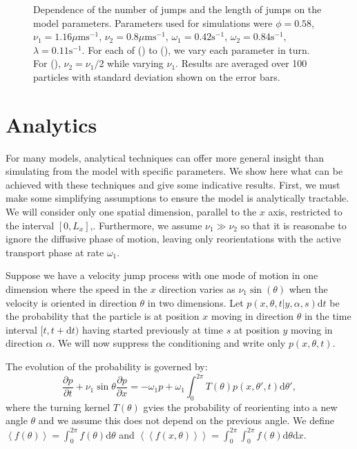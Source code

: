 \documentclass[twocolumn]{biophys}
\newlength\tindent
\renewcommand{\indent}{\hspace*{\tindent}}
\def\mean#1{\left< #1 \right>}
\begin{document}
\begin{figure*}
        \caption{ \small Dependence of the number of jumps and the length of jumps on the model parameters. Parameters used for simulations were $\phi=0.58$, $\nu_1=1.16 \mu \text{ms}^{-1}$, $\nu_2=0.8 \mu \text{ms}^{-1}$, $\omega_1=0.42 \text{s}^{-1}$, $\omega_2=0.84 \text{s}^{-1}$, $\lambda=0.11 \text{s}^{-1}$.
        For each of () to (), we vary each parameter in turn. 
        For (), $\nu_2=\nu_1 / 2$ while varying $\nu_1$. Results are averaged over 100 particles with standard deviation shown on the error bars.}
        \label{FIG:Sensitivity_analysis_2}
    \end{figure*}

    \section{Analytics} \label{Analytics}
For many models, analytical techniques can offer more general insight than simulating from the model with specific parameters.
We show here what can be achieved with these techniques and give some indicative results.
First, we must make some simplifying assumptions to ensure the model is analytically tractable. We will consider only one spatial dimension, parallel to the $x$ axis, restricted to the interval $[0,L_x]$,.
Furthermore, we assume $\nu_1 \gg \nu_2$ so that it is reasonabe to ignore the diffusive phase of motion, leaving only reorientations with the active transport phase at rate $\omega_1$.

\indent Suppose we have a velocity jump process with one mode of motion in one dimension where the speed in the $x$ direction varies as $\nu_1 \sin (\theta)$ when the velocity is oriented in direction $\theta$ in two dimensions.
Let $ p(x,\theta,t | y, \alpha, s)\text{d}t$ be the probability that the particle is at position $x$ moving in direction $\theta$ in the time interval $[t,t + \text{d}t)$ having started previously at time $s$ at position $y$ moving in direction $\alpha$.
We will now suppress the conditioning and write only $ p(x,\theta, t) $.

\indent The evolution of the probability is governed \citep{othmer1988models} by:
\begin{equation}\label{Evolution}
 \frac{\partial p}{\partial t} + \nu_1 \sin{\theta } \frac{\partial p}{\partial x} = -\omega_1 p + \omega_1 \int_0^{2\pi} T(\theta) p(x,\theta ', t) \text{d} \theta ',
\end{equation}
where the turning kernel $T(\theta)$ gvies the probability of reorienting into a new angle $\theta$ and we assume this does not depend on the previous angle.
We define $\mean{f(\theta)} = \int_0^{2\pi} f(\theta) \text{d} \theta $ and $\mean{\mean{f(x,\theta)}} =  \int_{0}^{2\pi} \int_0^{2\pi} f(\theta) \text{d} \theta \text{d}  x $.
\end{document}
